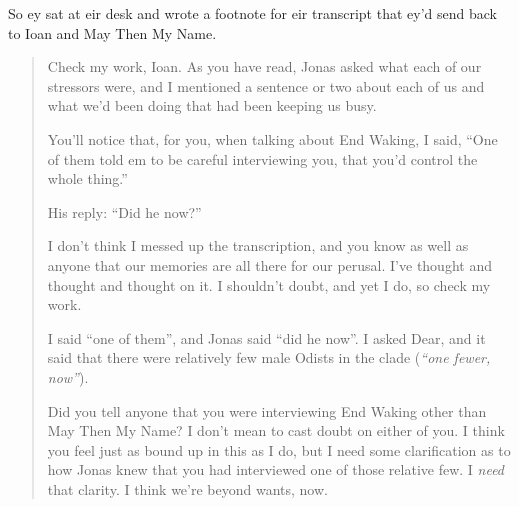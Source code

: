 So ey sat at eir desk and wrote a footnote for eir transcript that ey'd send back to Ioan and May Then My Name.

\begin{quote}
Check my work, Ioan. As you have read, Jonas asked what each of our stressors were, and I mentioned a sentence or two about each of us and what we'd been doing that had been keeping us busy.

You'll notice that, for you, when talking about End Waking, I said, ``One of them told em to be careful interviewing you, that you'd control the whole thing.''

His reply: ``Did he now?''

I don't think I messed up the transcription, and you know as well as anyone that our memories are all there for our perusal. I've thought and thought and thought on it. I shouldn't doubt, and yet I do, so check my work.

I said ``one of them'', and Jonas said ``did he now''. I asked Dear, and it said that there were relatively few male Odists in the clade (\emph{``one fewer, now''}).

Did you tell anyone that you were interviewing End Waking other than May Then My Name? I don't mean to cast doubt on either of you. I think you feel just as bound up in this as I do, but I need some clarification as to how Jonas knew that you had interviewed one of those relative few. I \emph{need} that clarity. I think we're beyond wants, now.
\end{quote}
